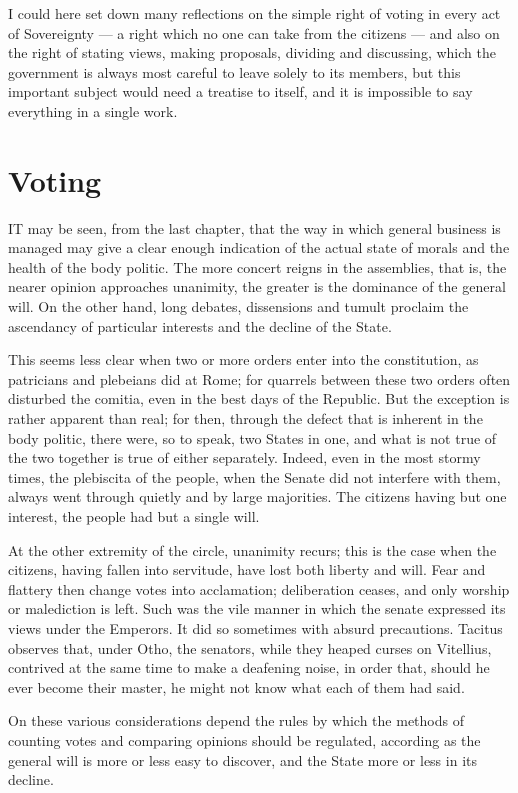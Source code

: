 \documentclass[12pt]{report}
\begin{document}
I could here set down many reflections on the simple right of voting in every act of Sovereignty — a right which no one can take from the citizens — and also on the right of stating views, making proposals, dividing and discussing, which the government is always most careful to leave solely to its members, but this important subject would need a treatise to itself, and it is impossible to say everything in a single work.

\section{Voting}
IT may be seen, from the last chapter, that the way in which general business is managed may give a clear enough indication of the actual state of morals and the health of the body politic. The more concert reigns in the assemblies, that is, the nearer opinion approaches unanimity, the greater is the dominance of the general will. On the other hand, long debates, dissensions and tumult proclaim the ascendancy of particular interests and the decline of the State.

This seems less clear when two or more orders enter into the constitution, as patricians and plebeians did at Rome; for quarrels between these two orders often disturbed the comitia, even in the best days of the Republic. But the exception is rather apparent than real; for then, through the defect that is inherent in the body politic, there were, so to speak, two States in one, and what is not true of the two together is true of either separately. Indeed, even in the most stormy times, the plebiscita of the people, when the Senate did not interfere with them, always went through quietly and by large majorities. The citizens having but one interest, the people had but a single will.

At the other extremity of the circle, unanimity recurs; this is the case when the citizens, having fallen into servitude, have lost both liberty and will. Fear and flattery then change votes into acclamation; deliberation ceases, and only worship or malediction is left. Such was the vile manner in which the senate expressed its views under the Emperors. It did so sometimes with absurd precautions. Tacitus observes that, under Otho, the senators, while they heaped curses on Vitellius, contrived at the same time to make a deafening noise, in order that, should he ever become their master, he might not know what each of them had said.

On these various considerations depend the rules by which the methods of counting votes and comparing opinions should be regulated, according as the general will is more or less easy to discover, and the State more or less in its decline.
\end{document}
